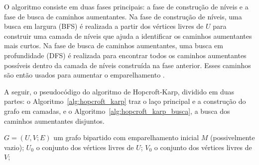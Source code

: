O algoritmo consiste em duas fases principais: a fase de construção de níveis e a fase de busca de caminhos aumentantes. Na fase de construção de níveis, uma busca em largura (BFS) é realizada a partir dos vértices livres de $U$ para construir uma camada de níveis que ajuda a identificar os caminhos aumentantes mais curtos. Na fase de busca de caminhos aumentantes, uma busca em profundidade (DFS) é realizada para encontrar todos os caminhos aumentantes possíveis dentro da camada de níveis construída na fase anterior. Esses caminhos são então usados para aumentar o emparelhamento \cite{halim}.

A seguir, o pseudocódigo do algoritmo de Hopcroft-Karp, dividido em duas partes: o Algoritmo~\ref{alg:hopcroft_karp} traz o laço principal e a construção do grafo em camadas, e o Algoritmo~\ref{alg:hopcroft_karp_busca}, a busca dos caminhos aumentantes disjuntos.

\begin{algorithm}[H]
    \DontPrintSemicolon
    \SetAlgoLined

    \caption{Algoritmo de Hopcroft-Karp: laço principal e grafo em camadas \cite{burkard}}
    \label{alg:hopcroft_karp}

    \KwLet $G = (U, V; E)$ um grafo bipartido com emparelhamento inicial $M$ (possivelmente vazio);\;
    \KwLet $U_0$ o conjunto dos vértices livres de $U$;\label{hk:u0}\;
    \KwLet $V_0$ o conjunto dos vértices livres de $V$;\label{hk:v0}\;
    

    \bigskip

\end{algorithm}

